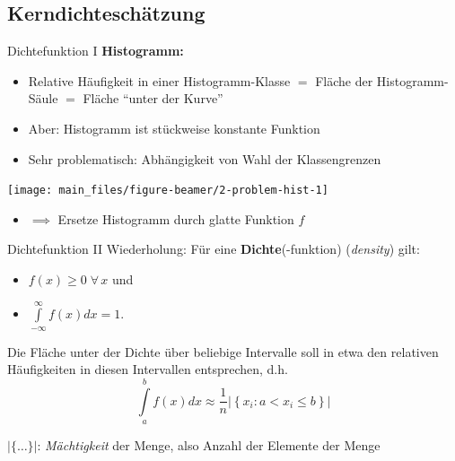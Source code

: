 \documentclass[
  10pt,
  ignorenonframetext,
]{beamer}
\providecommand{\tightlist}{%
  \setlength{\itemsep}{0pt}\setlength{\parskip}{0pt}}
\begin{document}
\subsection{Kerndichteschätzung}\label{kerndichteschuxe4tzung}

\begin{frame}{Dichtefunktion I}
\label{dichtefunktion-i}
\textbf{Histogramm:}

\begin{itemize}
\tightlist
\item
  Relative Häufigkeit in einer Histogramm-Klasse \(=\) Fläche der
  Histogramm-Säule \(=\) Fläche ``unter der Kurve''
\item
  Aber: Histogramm ist stückweise konstante Funktion
\item
  Sehr problematisch: Abhängigkeit von Wahl der Klassengrenzen
  \scriptsize
\end{itemize}

\begin{center}\texttt{[image: main\_files/figure-beamer/2-problem-hist-1]} \end{center}

\normalsize

\begin{itemize}
\tightlist
\item
  \(\implies\) Ersetze Histogramm durch glatte Funktion \(f\)
\end{itemize}
\end{frame}

\begin{frame}{Dichtefunktion II}
\label{dichtefunktion-ii}
Wiederholung: Für eine \textbf{Dichte}(-funktion) (\emph{density}) gilt:

\begin{itemize}
\tightlist
\item
  \(f(x) \geq 0  \;\forall\,x\) und
\item
  \(\int\limits_{-\infty}^{\infty} f(x)dx = 1.\)
\end{itemize}

Die Fläche unter der Dichte über beliebige Intervalle soll in etwa den
relativen Häufigkeiten in diesen Intervallen entsprechen, d.h.
\begin{equation*}
    \int\limits_a^b f(x)dx \approx \frac{1}{n} \left| \left\{x_i : a<x_i\leq b\right\}\right|
\end{equation*}

\(|\{\ldots\}|\): \emph{Mächtigkeit} der Menge, also Anzahl der Elemente
der Menge
\end{frame}
\end{document}
